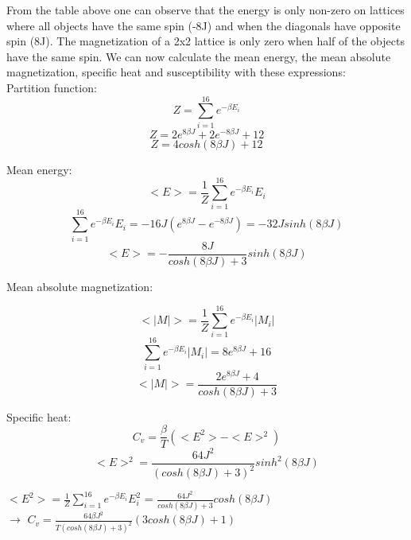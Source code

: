 \documentclass[10pt,a4paper]{article}
\begin{document}
\noindent From the table above one can observe that the energy is only non-zero on lattices where all objects have the same spin (-8J) and when the diagonals have opposite spin (8J). The magnetization of a 2x2 lattice is only zero when half of the objects have the same spin. We can now calculate the mean energy, the mean absolute magnetization, specific heat and susceptibility with these expressions:\\


Partition function:
$$Z = \sum\limits_{i=1}^{16}e^{-\beta E_i}$$
$$Z = 2e^{8\beta J} + 2e^{-8\beta J}+12$$
$$Z = 4cosh(8\beta J)+12$$

Mean energy:
$$<E> = \frac{1}{Z}\sum\limits_{i=1}^{16}e^{-\beta E_i}E_i$$
$$\sum\limits_{i=1}^{16}e^{-\beta E_i}E_i = -16J(e^{8\beta J}-e^{-8\beta J})=-32Jsinh(8\beta J)$$
$$<E>=-\frac{8J}{cosh(8\beta J)+3}sinh(8\beta J)$$

Mean absolute magnetization:

$$<|M|>=\frac{1}{Z}\sum\limits_{i=1}^{16}e^{-\beta E_i}|M_i|$$
$$\sum\limits_{i=1}^{16}e^{-\beta E_i}|M_i|=8e^{8\beta J}+16$$
$$<|M|>=\frac{2e^{8\beta J}+4}{cosh(8\beta J)+3}$$

Specific heat:
$$C_v = \frac{\beta}{T}(<E^2>-<E>^2)$$
$$<E>^2=\frac{64J^2}{(cosh(8\beta J)+3)^2}sinh^2(8\beta J)$$
\begin{center}
$<E^2>=\frac{1}{Z}\sum\limits_{i=1}^{16}e^{-\beta E_i}E_i^2$ = $\frac{64J^2}{cosh(8\beta J)+3}cosh(8\beta J)$\\
$\rightarrow$
$C_v = \frac{64\beta J^2}{T(cosh(8\beta J)+3)^2}(3cosh(8\beta J)+1)$
\end{center}
\end{document}
